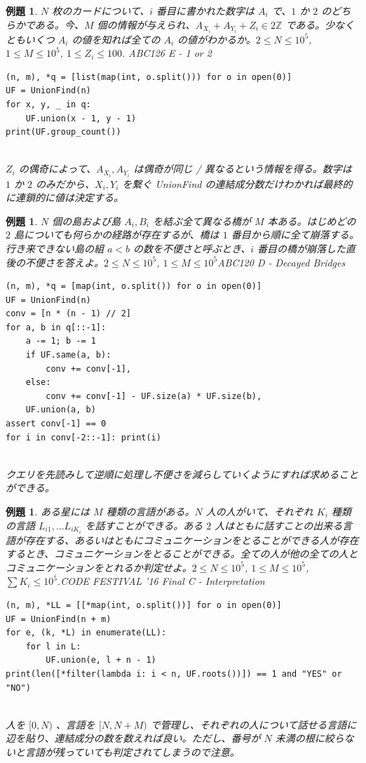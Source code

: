 \documentclass[12pt, a4j]{ltjsarticle}
\newtheorem{exm}[thm]{例題}
\newcommand*{\ZZ}{\mathbb{Z}}
\newcommand*{\SS}{\vspace{1cm}}
\begin{document}
\SS

\begin{exm} $N$ 枚のカードについて、$i$ 番目に書かれた数字は $A_i$ で、$1$ か $2$ のどちらかである。今、$M$ 個の情報が与えられ、$A_{X_i}+A_{Y_i}+Z_i \in 2\ZZ$ である。少なくともいくつ $A_i$ の値を知れば全ての $A_i$ の値がわかるか。$2\le N\le 10^5$, $1\le M\le 10^5$, $1\le Z_i\le 100$. \quad\upshape ABC126 E - 1 or 2
\begin{lstlisting}
(n, m), *q = [list(map(int, o.split())) for o in open(0)]
UF = UnionFind(n)
for x, y, _ in q:
    UF.union(x - 1, y - 1)
print(UF.group_count())
\end{lstlisting}\quad\\
$Z_i$ の偶奇によって、$A_{X_i},A_{Y_i}$ は偶奇が同じ / 異なるという情報を得る。数字は $1$ か $2$ のみだから、$X_i,Y_i$ を繋ぐ UnionFind の連結成分数だけわかれば最終的に連鎖的に値は決定する。
\end{exm}

\SS

\begin{exm} $N$ 個の島および島 $A_i,B_i$ を結ぶ全て異なる橋が $M$ 本ある。はじめどの $2$ 島についても何らかの経路が存在するが、橋は $1$ 番目から順に全て崩落する。行き来できない島の組 $a<b$ の数を不便さと呼ぶとき、$i$ 番目の橋が崩落した直後の不便さを答えよ。$2\le N\le 10^5$, $1\le M\le 10^5$\quad\upshape ABC120 D - Decayed Bridges\\
\begin{lstlisting}
(n, m), *q = [map(int, o.split()) for o in open(0)]
UF = UnionFind(n)
conv = [n * (n - 1) // 2]
for a, b in q[::-1]:
    a -= 1; b -= 1
    if UF.same(a, b):
        conv += conv[-1],
    else:
        conv += conv[-1] - UF.size(a) * UF.size(b),
    UF.union(a, b)
assert conv[-1] == 0
for i in conv[-2::-1]: print(i)
\end{lstlisting}\quad\\
クエリを先読みして逆順に処理し不便さを減らしていくようにすれば求めることができる。
\end{exm}

\newpage

\begin{exm} ある星には $M$ 種類の言語がある。$N$ 人の人がいて、それぞれ $K_i$ 種類の言語 $L_{i1},\ldots L_{iK_i}$ を話すことができる。ある $2$ 人はともに話すことの出来る言語が存在する、あるいはともにコミュニケーションをとることができる人が存在するとき、コミュニケーションをとることができる。全ての人が他の全ての人とコミュニケーションをとれるか判定せよ。$2\le N\le 10^5$, $1\le M\le 10^5$, $\sum K_i \le 10^5$.\quad\upshape CODE FESTIVAL '16 Final C - Interpretation\\
\begin{lstlisting}
(n, m), *LL = [[*map(int, o.split())] for o in open(0)]
UF = UnionFind(n + m)
for e, (k, *L) in enumerate(LL):
    for l in L:
        UF.union(e, l + n - 1)
print(len([*filter(lambda i: i < n, UF.roots())]) == 1 and "YES" or "NO")
\end{lstlisting}\quad\\
人を $[0,N)$ 、言語を $[N,N+M)$ で管理し、それぞれの人について話せる言語に辺を貼り、連結成分の数を数えれば良い。ただし、番号が $N$ 未満の根に絞らないと言語が残っていても判定されてしまうので注意。
\end{exm}
\end{document}
